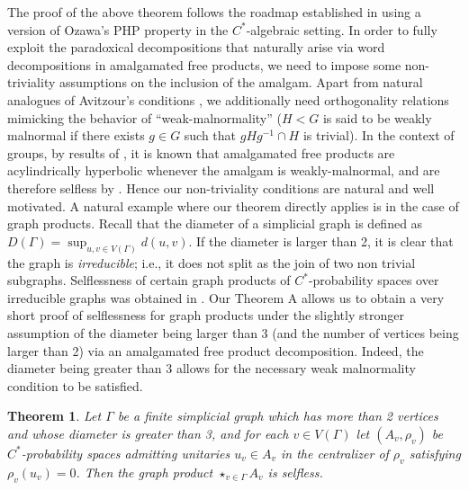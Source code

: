 \documentclass{amsart}
\newtheorem{theorem}{Theorem}[section]
\theoremstyle{definition}
\begin{document}
    The proof of the above theorem follows the roadmap established in \cite{hayes2025selfless} using a version of Ozawa's PHP property in the $C^*$-algebraic setting. In order to fully exploit the paradoxical decompositions that naturally arise via word decompositions in amalgamated free products, we need to impose some non-triviality assumptions on the inclusion of the amalgam. Apart from natural analogues of Avitzour's conditions \cite{Avitzour}, we additionally need orthogonality relations mimicking the behavior of ``weak-malnormality'' ($H<G$ is said to be weakly malnormal if there exists $g\in G$ such that $gHg^{-1}\cap H$ is trivial). In the context of groups, by results of \cite{MO15}, it is known that amalgamated free products are acylindrically hyperbolic whenever the amalgam is weakly-malnormal, and are therefore selfless by \cite{ozawa2025proximalityselflessnessgroupcalgebras, yang2025extreme}. Hence our non-triviality conditions are natural and well motivated. A natural example where our theorem directly applies is in the case of graph products. Recall that the diameter of a simplicial graph is defined as $D(\Gamma)= \sup_{u,v\in V(\Gamma)}d(u,v)$. If the diameter is larger than 2, it is clear that the graph is \emph{irreducible}; i.e., it does not split as the join of two non trivial subgraphs. Selflessness of certain graph products of $C^*$-probability spaces over irreducible graphs was obtained in \cite{fmmm2025selflessfreeprod}. Our Theorem A allows us to obtain a very short proof of selflessness for graph products under the slightly stronger assumption of the diameter being larger than 3 (and the number of vertices being larger than 2) via an amalgamated free product decomposition. Indeed, the diameter being greater than 3 allows for the necessary weak malnormality condition to be satisfied. 

\begin{theorem}
    Let $\Gamma$ be a finite simplicial graph which has more than 2 vertices and whose diameter is greater than 3, and for each $v\in V(\Gamma)$ let $(A_v,\rho_v)$ be $C^*$-probability spaces admitting unitaries $u_v\in A_v$ in the centralizer of $\rho_v$ satisfying $\rho_v(u_v)=0$. Then the graph product $\star_{v\in \Gamma}A_v$ is selfless.
\end{theorem} 
\end{document}
